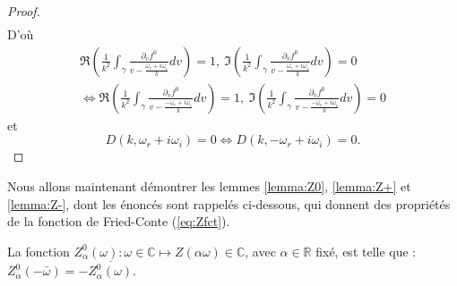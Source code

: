 \begin{proof}
\begin{eqnarray*}
  \end{eqnarray*}
  D'où
  \begin{eqnarray*}
    \Re\left(\frac{1}{k^2}\int_\gamma\frac{\partial_vf^0}{v-\frac{\omega_r+i\omega_i}{k}}dv\right)=1,~\Im\left(\frac{1}{k^2}\int_\gamma\frac{\partial_vf^0}{v-\frac{\omega_r+i\omega_i}{k}}dv\right)=0\\
    \Leftrightarrow
    \Re\left(\frac{1}{k^2}\int_\gamma\frac{\partial_vf^0}{v-\frac{-\omega_r+i\omega_i}{k}}dv\right)=1,~\Im\left(\frac{1}{k^2}\int_\gamma\frac{\partial_vf^0}{v-\frac{-\omega_r+i\omega_i}{k}}dv\right)=0
  \end{eqnarray*}
  et
  $$
    D(k,\omega_r+i\omega_i)=0\Leftrightarrow D(k,-\omega_r+i\omega_i)=0.
  $$
\end{proof}

Nous allons maintenant démontrer les lemmes \ref{lemma:Z0}, \ref{lemma:Z+} et \ref{lemma:Z-}, dont les énoncés sont rappelés ci-dessous, qui donnent des propriétés de la fonction de Fried-Conte (\ref{eq:Zfct}).

\begin{lemma}
  La fonction $Z_\alpha^0(\omega):\omega\in\mathbb{C}\mapsto Z\left(\alpha\omega\right)\in\mathbb{C}$, avec $\alpha\in\mathbb{R}$ fixé, est telle que : $Z_\alpha^0(-\bar{\omega}) = -\overline{Z_\alpha^0(\omega)}$.
\end{lemma}
 
